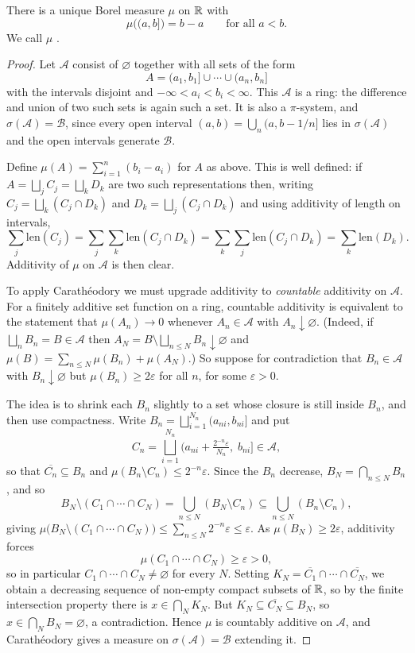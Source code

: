 \documentclass[a4paper]{scrartcl}
\newcommand{\cA}{\mathcal{A}}
\newcommand{\cB}{\mathcal{B}}
\begin{document}
\begin{theorem}\label{thm:lebesgue}
	There is a unique Borel measure $\mu$ on $\mathbb{R}$ with
	$$
	\mu\big( (a,b] \big) = b - a \qquad \text{for all } a < b.
	$$
	We call $\mu$ .
\end{theorem}
\begin{proof}
	Let $\cA$ consist of $\varnothing$ together with all sets of the form
	$$
	A = (a_1, b_1] \cup \cdots \cup (a_n, b_n]
	$$
	with the intervals disjoint and $-\infty < a_i < b_i < \infty$. This $\cA$ is a ring: the difference and union of two such sets is again such a set. It is also a $\pi$-system, and $\sigma(\cA) = \cB$, since every open interval $(a,b) = \bigcup_n (a, b - 1/n]$ lies in $\sigma(\cA)$ and the open intervals generate $\cB$.

	Define $\mu(A) = \sum_{i=1}^n (b_i - a_i)$ for $A$ as above. This is well defined: if $A = \bigsqcup_j C_j = \bigsqcup_k D_k$ are two such representations then, writing $C_j = \bigsqcup_k (C_j \cap D_k)$ and $D_k = \bigsqcup_j (C_j \cap D_k)$ and using additivity of length on intervals,
	$$
	\sum_j \mathrm{len}(C_j) = \sum_j \sum_k \mathrm{len}(C_j \cap D_k) = \sum_k \sum_j \mathrm{len}(C_j \cap D_k) = \sum_k \mathrm{len}(D_k).
	$$
	Additivity of $\mu$ on $\cA$ is then clear.

	To apply Carath\'eodory we must upgrade additivity to \emph{countable} additivity on $\cA$. For a finitely additive set function on a ring, countable additivity is equivalent to the statement that $\mu(A_n) \to 0$ whenever $A_n \in \cA$ with $A_n \downarrow \varnothing$. (Indeed, if $\bigsqcup_n B_n = B \in \cA$ then $A_N = B \setminus \bigsqcup_{n \leq N} B_n \downarrow \varnothing$ and $\mu(B) = \sum_{n \leq N}\mu(B_n) + \mu(A_N)$.) So suppose for contradiction that $B_n \in \cA$ with $B_n \downarrow \varnothing$ but $\mu(B_n) \geq 2\varepsilon$ for all $n$, for some $\varepsilon > 0$.

	The idea is to shrink each $B_n$ slightly to a set whose closure is still inside $B_n$, and then use compactness. Write $B_n = \bigsqcup_{i=1}^{N_n} (a_{ni}, b_{ni}]$ and put
	$$
	C_n = \bigsqcup_{i=1}^{N_n} \Big( a_{ni} + \tfrac{2^{-n}\varepsilon}{N_n},\; b_{ni} \Big] \in \cA,
	$$
	so that $\overline{C_n} \subseteq B_n$ and $\mu(B_n \setminus C_n) \leq 2^{-n}\varepsilon$. Since the $B_n$ decrease, $B_N = \bigcap_{n \leq N} B_n$, and so
	$$
	B_N \setminus (C_1 \cap \cdots \cap C_N) = \bigcup_{n \leq N} (B_N \setminus C_n) \subseteq \bigcup_{n\leq N} (B_n \setminus C_n),
	$$
	giving $\mu\big( B_N \setminus (C_1 \cap \cdots \cap C_N)\big) \leq \sum_{n \leq N} 2^{-n}\varepsilon \leq \varepsilon$. As $\mu(B_N) \geq 2\varepsilon$, additivity forces
	$$
	\mu(C_1 \cap \cdots \cap C_N) \geq \varepsilon > 0,
	$$
	so in particular $C_1 \cap \cdots \cap C_N \neq \varnothing$ for every $N$. Setting $K_N = \overline{C_1} \cap \cdots \cap \overline{C_N}$, we obtain a decreasing sequence of non-empty compact subsets of $\mathbb{R}$, so by the finite intersection property there is $x \in \bigcap_N K_N$. But $K_N \subseteq \overline{C_N} \subseteq B_N$, so $x \in \bigcap_N B_N = \varnothing$, a contradiction. Hence $\mu$ is countably additive on $\cA$, and Carath\'eodory gives a measure on $\sigma(\cA) = \cB$ extending it.


\end{proof}
\end{document}
